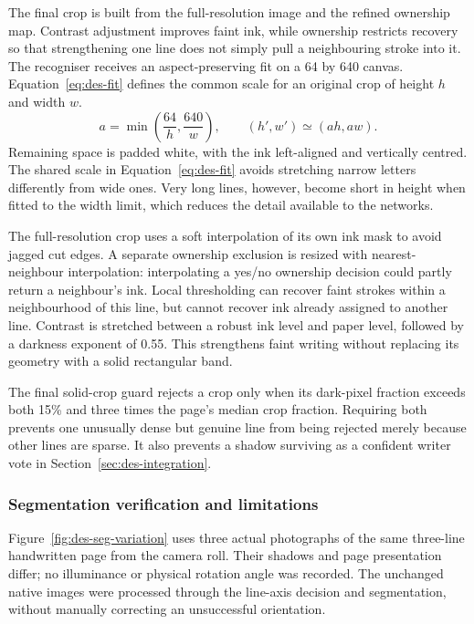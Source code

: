 The final crop is built from the full-resolution image and the refined ownership map. Contrast adjustment improves faint ink, while ownership restricts recovery so that strengthening one line does not simply pull a neighbouring stroke into it. The recogniser receives an aspect-preserving fit on a 64 by 640 canvas. Equation~\ref{eq:des-fit} defines the common scale for an original crop of height $h$ and width $w$.
\begin{equation}
a=\min\left(\frac{64}{h},\frac{640}{w}\right),\qquad
(h',w')\simeq(ah,aw).
\label{eq:des-fit}
\end{equation}
Remaining space is padded white, with the ink left-aligned and vertically centred. The shared scale in Equation~\ref{eq:des-fit} avoids stretching narrow letters differently from wide ones. Very long lines, however, become short in height when fitted to the width limit, which reduces the detail available to the networks.

The full-resolution crop uses a soft interpolation of its own ink mask to avoid jagged cut edges. A separate ownership exclusion is resized with nearest-neighbour interpolation: interpolating a yes/no ownership decision could partly return a neighbour's ink. Local thresholding can recover faint strokes within a neighbourhood of this line, but cannot recover ink already assigned to another line. Contrast is stretched between a robust ink level and paper level, followed by a darkness exponent of 0.55. This strengthens faint writing without replacing its geometry with a solid rectangular band.

The final solid-crop guard rejects a crop only when its dark-pixel fraction exceeds both 15\% and three times the page's median crop fraction. Requiring both prevents one unusually dense but genuine line from being rejected merely because other lines are sparse. It also prevents a shadow surviving as a confident writer vote in Section~\ref{sec:des-integration}.

\subsubsection{Segmentation verification and limitations}
\label{sec:des-segverify}
Figure~\ref{fig:des-seg-variation} uses three actual photographs of the same three-line handwritten page from the camera roll. Their shadows and page presentation differ; no illuminance or physical rotation angle was recorded. The unchanged native images were processed through the line-axis decision and segmentation, without manually correcting an unsuccessful orientation.

